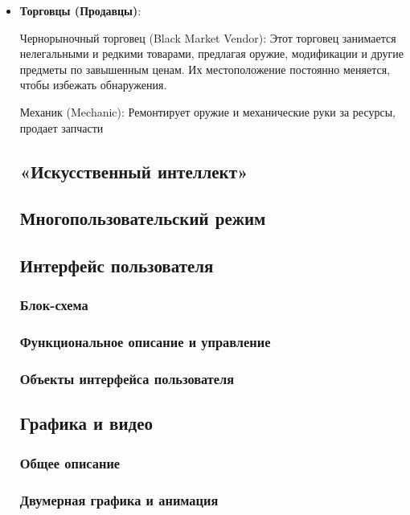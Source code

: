\documentclass{article}
\begin{document}
\begin{itemize} 
    \item \textbf{Торговцы (Продавцы)}: 
    
    Чернорыночный торговец (Black Market Vendor): Этот торговец занимается нелегальными и редкими товарами, предлагая оружие, модификации и другие предметы по завышенным ценам. Их местоположение постоянно меняется, чтобы избежать обнаружения. 

    Механик (Mechanic): Ремонтирует оружие и механические руки за ресурсы, продает запчасти
\subsection{«Искусственный интеллект»}

\subsection{Многопользовательский режим}

\subsection{Интерфейс пользователя}

\subsubsection{Блок-схема}

\subsubsection{Функциональное описание и управление}

\subsubsection{Объекты интерфейса пользователя}

\subsection{Графика и видео}

\subsubsection{Общее описание}

\subsubsection{Двумерная графика и анимация}


\end{itemize}
\end{document}
